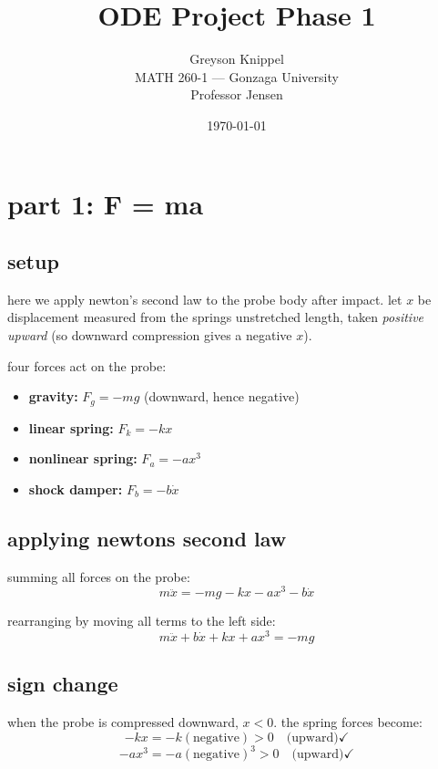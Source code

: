 \documentclass[12pt]{article}
\title{ODE Project Phase 1}
\author{
Greyson Knippel \\[4pt]
MATH 260-1 --- Gonzaga University \\[4pt]
Professor Jensen
}
\date{\today}
\begin{document}
\maketitle

\section{part 1: F = ma}

\subsection{setup}

here we apply newton's second law to the probe body after impact. let $x$ be displacement measured from the springs unstretched length, taken \textit{positive upward} (so downward compression gives a negative $x$).

four forces act on the probe:
\begin{itemize}
    \item \textbf{gravity:} $F_g = -mg$ \quad (downward, hence negative)
    \item \textbf{linear spring:} $F_k = -kx$
    \item \textbf{nonlinear spring:} $F_a = -ax^3$
    \item \textbf{shock damper:} $F_b = -b\dot{x}$
\end{itemize}

\subsection{applying newtons second law}

summing all forces on the probe:
\[
    m\ddot{x} = -mg - kx - ax^3 - b\dot{x}
\]

rearranging by moving all terms to the left side:
\[
    \boxed{m\ddot{x} + b\dot{x} + kx + ax^3 = -mg}
\]

\subsection{sign change}

when the probe is compressed downward, $x < 0$. the spring forces become:
\[
    -kx = -k(\text{negative}) > 0 \quad \text{(upward)} \checkmark
\]
\[
    -ax^3 = -a(\text{negative})^3 > 0 \quad \text{(upward)} \checkmark
\]


\end{document}
